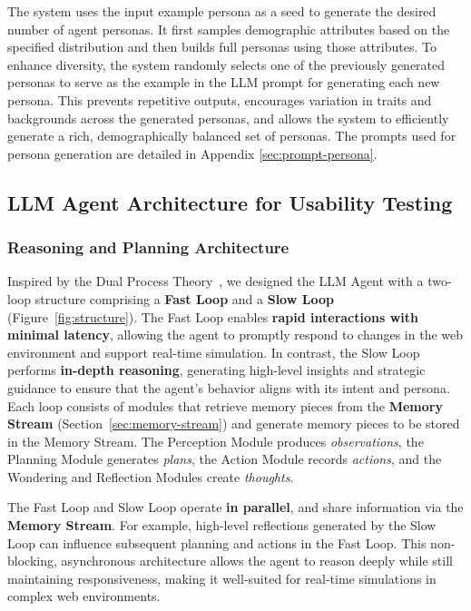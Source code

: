 \documentclass[manuscript,review,anonymous]{acmart}
\begin{document}
The system uses the input example persona as a seed to generate the desired number of agent personas. It first samples demographic attributes based on the specified distribution and then builds full personas using those attributes. To enhance diversity, the system randomly selects one of the previously generated personas to serve as the example in the LLM prompt for generating each new persona.
This prevents repetitive outputs, encourages variation in traits and backgrounds across the generated personas, and allows the system to efficiently generate a rich, demographically balanced set of personas.
The prompts used for persona generation are detailed in Appendix \ref{sec:prompt-persona}.

\subsection{LLM Agent Architecture for Usability Testing}


\subsubsection{Reasoning and Planning Architecture}
Inspired by the Dual Process Theory~\cite{kahneman2011thinking,evansDualProcessTheoriesHigher2013}, we designed the LLM Agent with a two-loop structure comprising a \textbf{Fast Loop} and a \textbf{Slow Loop} (Figure~\ref{fig:structure}). 
The Fast Loop enables \textbf{rapid interactions with minimal latency}, allowing the agent to promptly respond to changes in the web environment and support real-time simulation.
In contrast, the Slow Loop performs \textbf{in-depth reasoning}, generating high-level insights and strategic guidance to ensure that the agent's behavior aligns with its intent and persona.
Each loop consists of modules that retrieve memory pieces from the \textbf{Memory Stream} (Section~\ref{sec:memory-stream}) and generate memory pieces to be stored in the Memory Stream.
The Perception Module produces \textit{observations}, the Planning Module generates \textit{plans}, the Action Module records \textit{actions}, and the Wondering and Reflection Modules create \textit{thoughts}.

The Fast Loop and Slow Loop operate \textbf{in parallel}, and share information via the \textbf{Memory Stream}.
For example, high-level reflections generated by the Slow Loop can influence subsequent planning and actions in the Fast Loop. 
This non-blocking, asynchronous architecture allows the agent to reason deeply while still maintaining responsiveness, making it well-suited for real-time simulations in complex web environments.
\end{document}
